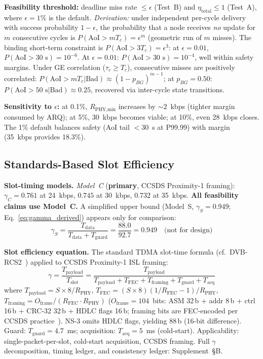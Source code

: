 \documentclass[journal]{IEEEtran}
\begin{document}
\textbf{Feasibility threshold:} deadline miss rate $\leq \epsilon$ (Test~B) and $\eta_{\text{total}} \leq 1$ (Test~A), where $\epsilon = 1\%$ is the default. \emph{Derivation:} under independent per-cycle delivery with success probability $1 - \epsilon$, the probability that a node receives \emph{no} update for $m$ consecutive cycles is $P(\text{AoI} > m T_c) = \epsilon^m$ (geometric run of $m$ misses). The binding short-term constraint is $P(\text{AoI} > 3 T_c) = \epsilon^3$: at $\epsilon = 0.01$, $P(\text{AoI} > 30\text{~s}) = 10^{-6}$. At $\epsilon = 0.01$: $P(\text{AoI} > 30\text{~s}) = 10^{-4}$, well within safety margins. Under GE correlation ($\tau_c \geq T_c$), consecutive misses are positively correlated: $P(\text{AoI} > m T_c | \text{Bad}) \approx (1 - p_{BG})^{m-1}$; at $p_{BG} = 0.50$: $P(\text{AoI} > 50\text{~s}|\text{Bad}) \approx 0.25$, recovered via inter-cycle state transitions.

\textbf{Sensitivity to $\epsilon$:} at 0.1\%, $R_{\text{PHY,min}}$ increases by ${\sim}2$~kbps (tighter margin consumed by ARQ); at 5\%, 30~kbps becomes viable; at 10\%, even 28~kbps closes. The 1\% default balances safety (AoI tail $< 30$~s at P99.99) with margin (35~kbps provides 18.3\%).

\subsection{Standards-Based Slot Efficiency}
\label{sec:packet_derivation}

\textbf{Slot-timing models.} \emph{Model~C} (\textbf{primary}, CCSDS Proximity-1 framing): $\gamma_C = 0.761$ at 24~kbps, $0.745$ at 30~kbps, $0.732$ at 35~kbps. \textbf{All feasibility claims use Model~C.} A simplified upper bound (Model~S, $\gamma_S = 0.949$; Eq.~\ref{eq:gamma_derived}) appears only for comparison:
\begin{equation}
    \gamma_S = \frac{T_{\text{data}}}{T_{\text{data}} + T_{\text{guard}}} = \frac{88.0}{92.7} = 0.949 \quad \text{(not for design)}
    \label{eq:gamma_derived}
\end{equation}

\textbf{Slot efficiency equation.} The standard TDMA slot-time formula (cf.\ DVB-RCS2~\cite{dvb_rcs2}) applied to CCSDS Proximity-1 ISL framing:
\begin{equation}
    \gamma = \frac{T_{\text{payload}}}{T_{\text{slot}}} = \frac{T_{\text{payload}}}{T_{\text{payload}} + T_{\text{FEC}} + T_{\text{framing}} + T_{\text{guard}} + T_{\text{acq}}}
    \label{eq:gamma_time}
\end{equation}
where $T_{\text{payload}} = S \times 8 / R_{\text{PHY}}$, $T_{\text{FEC}} = (S \times 8)(1/R_{\text{FEC}} - 1) / R_{\text{PHY}}$, $T_{\text{framing}} = O_{\text{frame}} / (R_{\text{FEC}} \cdot R_{\text{PHY}})$ ($O_{\text{frame}} = 104$~bits: ASM 32\,b + addr 8\,b + ctrl 16\,b + CRC-32 32\,b + HDLC flags 16\,b; framing bits are FEC-encoded per CCSDS practice~\cite{ccsds_prox1}). NS-3 omits HDLC flags, yielding 88\,b (16-bit difference). Guard: $T_{\text{guard}} = 4.7$~ms; acquisition: $T_{\text{acq}} = 5$~ms (cold-start). Applicability: single-packet-per-slot, cold-start acquisition, CCSDS framing. Full $\gamma$ decomposition, timing ledger, and consistency ledger: Supplement~\S B.
\end{document}
